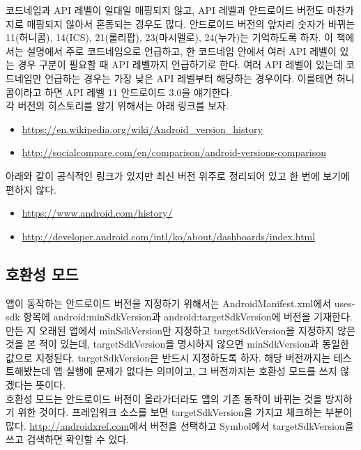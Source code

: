 코드네임과 API 레벨이 일대일 매핑되지 않고, API 레벨과 안드로이드 버전도 마찬가지로 매핑되지 않아서 혼동되는 경우도 많다. 
안드로이드 버전의 앞자리 숫자가 바뀌는 11(허니콤), 14(ICS), 21(롤리팝), 23(마시멜로), 24(누가)는 기억하도록 하자.
이 책에서는 설명에서 주로 코드네임으로 언급하고, 한 코드네임 안에서 여러 API 레벨이 있는 경우 구분이 필요할 때 API 레벨까지 언급하기로 한다. 
여러 API 레벨이 있는데 코드네임만 언급하는 경우는 가장 낮은 API 레벨부터 해당하는 경우이다. 이를테면 허니콤이라고 하면 API 레벨 11 안드로이드 3.0을 얘기한다.\\

각 버전의 히스토리를 알기 위해서는 아래 링크를 보자.
\begin{itemize}
\item \url{https://en.wikipedia.org/wiki/Android_version_history}
\item \url{http://socialcompare.com/en/comparison/android-versions-comparison}
\end{itemize}
아래와 같이 공식적인 링크가 있지만 최신 버전 위주로 정리되어 있고 한 번에 보기에 편하지 않다.
\begin{itemize}
\item \url{https://www.android.com/history/}
\item \url{http://developer.android.com/intl/ko/about/dashboards/index.html}
\end{itemize}

\subsection{호환성 모드}
앱이 동작하는 안드로이드 버전을 지정하기 위해서는 AndroidManifest.xml에서 uses-sdk 항목에  android:min\-SdkVersion과 android:targetSdkVersion에 버전을 기재한다. 
만든 지 오래된 앱에서 minSdkVersion만 지정하고 targetSdkVersion을 지정하지 않은 것을 본 적이 있는데, targetSdkVersion을 명시하지 않으면 minSdkVersion과 동일한 값으로 지정된다.
targetSdkVersion은 반드시 지정하도록 하자. 해당 버전까지는 테스트해봤는데 앱 실행에 문제가 없다는 의미이고, 그 버전까지는 호환성 모드를 쓰지 않겠다는 뜻이다.\\

호환성 모드는 안드로이드 버전이 올라가더라도 앱의 기존 동작이 바뀌는 것을 방지하기 위한 것이다.
프레임워크 소스를 보면 targetSdkVersion을 가지고 체크하는 부분이 많다.
\url{http://androidxref.com}에서 버전을 선택하고 Symbol에서 targetSdkVersion을 쓰고 검색하면 확인할 수 있다.\\


